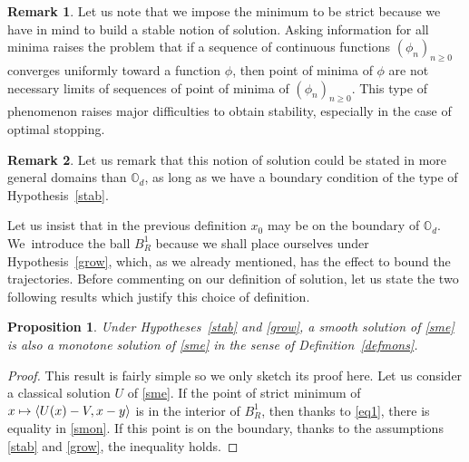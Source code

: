 \documentclass[10pt]{amsart}
\newcommand\mto{\mathchoice{\longmapsto}{\mapsto}{\mapsto}{\mapsto}}
\newtheorem{Prop}{Proposition}[section]
\theoremstyle{definition}
\newtheorem{Rem}{Remark}[section]
\begin{document}
\begin{Rem}
Let us note that we impose the minimum to be strict because we have in mind to build a stable notion of solution. Asking information for all minima raises the problem that if a sequence of continuous functions $(\phi_n)_{n \geq 0}$ converges uniformly toward a function $\phi$, then point of minima of $\phi$ are not necessary limits of sequences of point of minima of $(\phi_n)_{n \geq 0}$. This type of phenomenon raises major difficulties to obtain stability, especially in the case of optimal stopping.
\end{Rem}

\begin{Rem}
Let us remark that this notion of solution could be stated in more general domains than $\mathbb{O}_d$, as long as we have a boundary condition of the type of Hypothesis~\ref{stab}.
\end{Rem}
Let us insist that in the previous definition $x_0$ may be on the boundary of $\mathbb{O}_d$. We~introduce the ball $B^1_R$ because we shall place ourselves under Hypothesis~\ref{grow}, which, as we already mentioned, has the effect to bound the trajectories. Before commenting on our definition of solution, let us state the two following results which justify this choice of definition.
\begin{Prop}
Under Hypotheses~\ref{stab} and \ref{grow}, a smooth solution of \eqref{sme} is also a monotone solution of \eqref{sme} in the sense of Definition~\ref{defmons}.
\end{Prop}

\begin{proof}
This result is fairly simple so we only sketch its proof here. Let us consider a classical solution $U$ of \eqref{sme}. If the point of strict minimum of $x \mto \langle U(x)-V, x-y \rangle$ is in the interior of $B^1_R$, then thanks to \eqref{eq1}, there is equality in \eqref{smon}. If this point is on the boundary, thanks to the assumptions \ref{stab} and \ref{grow}, the inequality holds.
\end{proof}
\end{document}
